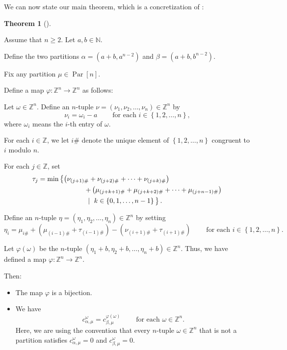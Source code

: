 \documentclass[numbers=enddot,12pt,final,onecolumn,notitlepage]{scrartcl}%
\theoremstyle{definition}
\newtheorem{theo}{Theorem}[section]
\newenvironment{theorem}[1][]
{\begin{theo}[#1]\begin{leftbar}}
{\end{leftbar}\end{theo}}
\begin{document}
We can now state our main theorem, which is a concretization of
\cite[Conjecture 1]{PelRes20}:

\begin{theorem}
\label{thm.main}Assume that $n\geq2$. Let $a,b\in\mathbb{N}$.

Define the two partitions $\alpha=\left(  a+b,a^{n-2}\right)  $ and
$\beta=\left(  a+b,b^{n-2}\right)  $.

Fix any partition $\mu\in\operatorname*{Par}\left[  n\right]  $.

Define a map $\varphi:\mathbb{Z}^{n}\rightarrow\mathbb{Z}^{n}$ as follows:

Let $\omega\in\mathbb{Z}^{n}$. Define an $n$-tuple $\nu=\left(  \nu_{1}%
,\nu_{2},\ldots,\nu_{n}\right)  \in\mathbb{Z}^{n}$ by
\[
\nu_{i}=\omega_{i}-a\ \ \ \ \ \ \ \ \ \ \text{for each }i\in\left\{
1,2,\ldots,n\right\}  ,
\]
where $\omega_{i}$ means the $i$-th entry of $\omega$.

For each $i\in\mathbb{Z}$, we let $i\#$ denote the unique element of $\left\{
1,2,\ldots,n\right\}  $ congruent to $i$ modulo $n$.

For each $j\in\mathbb{Z}$, set%
\begin{align*}
\tau_{j}  &  =\min\left\{  \left(  \nu_{\left(  j+1\right)  \#}+\nu_{\left(
j+2\right)  \#}+\cdots+\nu_{\left(  j+k\right)  \#}\right)  \right. \\
&  \ \ \ \ \ \ \ \ \ \ \ \ \ \ \ \ \ \ \ \ \left.  +\left(  \mu_{\left(
j+k+1\right)  \#}+\mu_{\left(  j+k+2\right)  \#}+\cdots+\mu_{\left(
j+n-1\right)  \#}\right)  \right. \\
&  \ \ \ \ \ \ \ \ \ \ \ \ \ \ \ \ \ \ \ \ \left.  \ \mid\ k\in\left\{
0,1,\ldots,n-1\right\}
\vphantom{\left(\nu_{\left(j+1\right)\#}\right)}\right\}  .
\end{align*}


Define an $n$-tuple $\eta=\left(  \eta_{1},\eta_{2},\ldots,\eta_{n}\right)
\in\mathbb{Z}^{n}$ by setting%
\[
\eta_{i}=\mu_{i\#}+\left(  \mu_{\left(  i-1\right)  \#}+\tau_{\left(
i-1\right)  \#}\right)  -\left(  \nu_{\left(  i+1\right)  \#}+\tau_{\left(
i+1\right)  \#}\right)  \ \ \ \ \ \ \ \ \ \ \text{for each }i\in\left\{
1,2,\ldots,n\right\}  .
\]


Let $\varphi\left(  \omega\right)  $ be the $n$-tuple $\left(  \eta_{1}%
+b,\eta_{2}+b,\ldots,\eta_{n}+b\right)  \in\mathbb{Z}^{n}$. Thus, we have
defined a map $\varphi:\mathbb{Z}^{n}\rightarrow\mathbb{Z}^{n}$.

Then:

\begin{itemize}
\item[\textbf{(a)}] The map $\varphi$ is a bijection.

\item[\textbf{(b)}] We have%
\[
c_{\alpha,\mu}^{\omega}=c_{\beta,\mu}^{\varphi\left(  \omega\right)
}\ \ \ \ \ \ \ \ \ \ \text{for each }\omega\in\mathbb{Z}^{n}.
\]
Here, we are using the convention that every $n$-tuple $\omega\in
\mathbb{Z}^{n}$ that is not a partition satisfies $c_{\alpha,\mu}^{\omega}=0$
and $c_{\beta,\mu}^{\omega}=0$.
\end{itemize}
\end{theorem}
\end{document}
